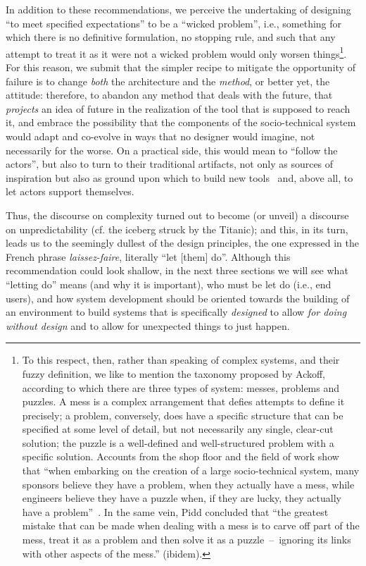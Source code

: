 \documentclass{article}
\begin{document}
In addition to these recommendations, we perceive the undertaking of designing ``to meet specified expectations'' to be a ``wicked problem''\citep{fitzpatrick_locales_2003}, i.e., something for which there is no definitive formulation, no stopping rule, and such that any attempt to treat it as it were not a wicked problem would only worsen things\footnote{To this respect, then, rather than speaking of complex systems, and their fuzzy definition, we like to mention the taxonomy proposed by Ackoff, according to which there are three types of system: messes, problems and puzzles. A mess is a complex arrangement that defies attempts to define it precisely; a problem, conversely, does have a specific structure that can be specified at some level of detail, but not necessarily any single, clear-cut solution; the puzzle is a well-defined and well-structured problem with a specific solution. Accounts from the shop floor and the field of work show that ``when embarking on the creation of a large socio-technical system, many sponsors believe they have a problem, when they actually have a mess, while engineers believe they have a puzzle when, if they are lucky, they actually have a problem''~\citep[p. 118]{mansfield_nature_2010}. In the same vein, Pidd concluded that ``the greatest mistake that can be made when dealing with a mess is to carve off part of the mess, treat it as a problem and then solve it as a puzzle~--~ignoring its links with other aspects of the mess.'' (ibidem).}. For this reason, we submit that the simpler recipe to mitigate the opportunity of failure is to change \emph{both} the architecture and the \emph{method}, or better yet, the attitude: therefore, to abandon any method that deals with the future, that \emph{projects} an idea of future in the realization of the tool that is supposed to reach it, and embrace the possibility that the components of the socio-technical system would adapt and co-evolve in ways that no designer would imagine, not necessarily for the worse. On a practical side, this would mean to ``follow the actors''\citep{bannon_human_1992,latour_interobjectivity_1996}, but also to turn to their traditional artifacts, not only as sources of inspiration but also as ground upon which to build new tools~\citep{cabitza_remain_2011} and, above all, to let actors support themselves. 

Thus, the discourse on complexity turned out to become (or unveil) a discourse on unpredictability (cf. the iceberg struck by the Titanic); and this, in its turn, leads us to the seemingly dullest of the design principles, the one expressed in the French phrase \emph{laissez-faire}, literally ``let [them] do''. Although this recommendation could look shallow, in the next three sections we will see what ``letting do'' means (and why it is important), who must be let do (i.e., end users), and how system development should be oriented towards the building of an environment to build systems that is specifically \emph{designed} to allow \emph{for doing without design} and to allow for unexpected things to just happen. 
\end{document}
